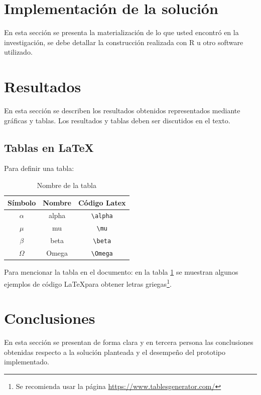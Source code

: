 \documentclass[journal]{IEEEtran}
\begin{document}

\section{Implementación de la solución}
En esta sección se presenta la materialización de lo que usted encontró en la investigación, se debe detallar la construcción realizada con R u otro software utilizado.

\section{Resultados}
En esta sección se describen  los resultados obtenidos representados mediante gráficas y tablas. Los resultados y tablas deben ser discutidos en el texto. 
\subsection{Tablas en \LaTeX}
Para definir una tabla:

\begin{table}[H]
\centering
\caption{Nombre de la tabla}
\label{table1}
\begin{tabular}{c c c}\hline\hline
\textbf{Símbolo} & \textbf{Nombre} & \textbf{Código Latex}\\ \hline
$\alpha$ & alpha & \verb|\alpha| \\
$\mu$ & mu & \verb|\mu|\\
$\beta$ & beta & \verb|\beta|\\
$\Omega$ & Omega & \verb|\Omega| \\\hline \hline
\end{tabular}
\end{table}
Para mencionar la tabla en el documento: en la tabla \ref{table1} se muestran algunos ejemplos de código \LaTeX para obtener letras griegas\footnote{Se recomienda usar la página \url{https://www.tablesgenerator.com/}}.


\section{Conclusiones}
En esta sección se presentan de forma clara y en tercera persona las conclusiones obtenidas respecto a la solución planteada y el desempeño del prototipo implementado.
\end{document}
